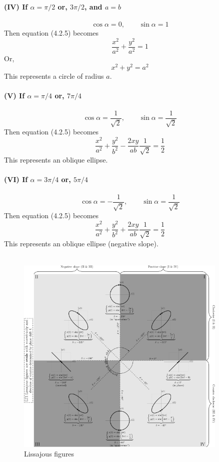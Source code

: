\documentclass[12pt]{article}
\numberwithin{equation}{subsection}
\begin{document}
\textbf{(IV) If $\alpha=\pi/2$ or, $3\pi/2$, and $a=b$}\\~\\
\[ \cos{\alpha} = 0, \qquad \sin{\alpha} = 1 \]
Then equation (4.2.5) becomes \[
    \frac{x^2}{a^2} + \frac{y^2}{a^2} = 1
\]
Or, \[
    x^2 + y^2 = a^2
\]
This represents a circle of radius $a$.\\~\\

\textbf{(V) If $\alpha=\pi/4$ or, $7\pi/4$}\\~\\
\[ \cos{\alpha} = \frac{1}{\sqrt{2}}, \qquad \sin{\alpha} = \frac{1}{\sqrt{2}} \]
Then equation (4.2.5) becomes \[
    \frac{x^2}{a^2} + \frac{y^2}{b^2} - \frac{2xy}{ab} \frac{1}{\sqrt{2}} = \frac{1}{2}
\]
This represents an oblique ellipse.\\~\\

\textbf{(VI) If $\alpha=3\pi/4$ or, $5\pi/4$}\\~\\
\[ \cos{\alpha} = -\frac{1}{\sqrt{2}}, \qquad \sin{\alpha} = \frac{1}{\sqrt{2}} \]
Then equation (4.2.5) becomes \[
    \frac{x^2}{a^2} + \frac{y^2}{b^2} + \frac{2xy}{ab} \frac{1}{\sqrt{2}} = \frac{1}{2}
\]
This represents an oblique ellipse (negative slope).\\~\\

\begin{figure}[htpb]
    \centering
    \includegraphics[width=0.9\textwidth]{Lissajous.png}
    \caption{Lissajous figures}
    \label{fig:Lissajous-png}
\end{figure}
\newpage
\end{document}
